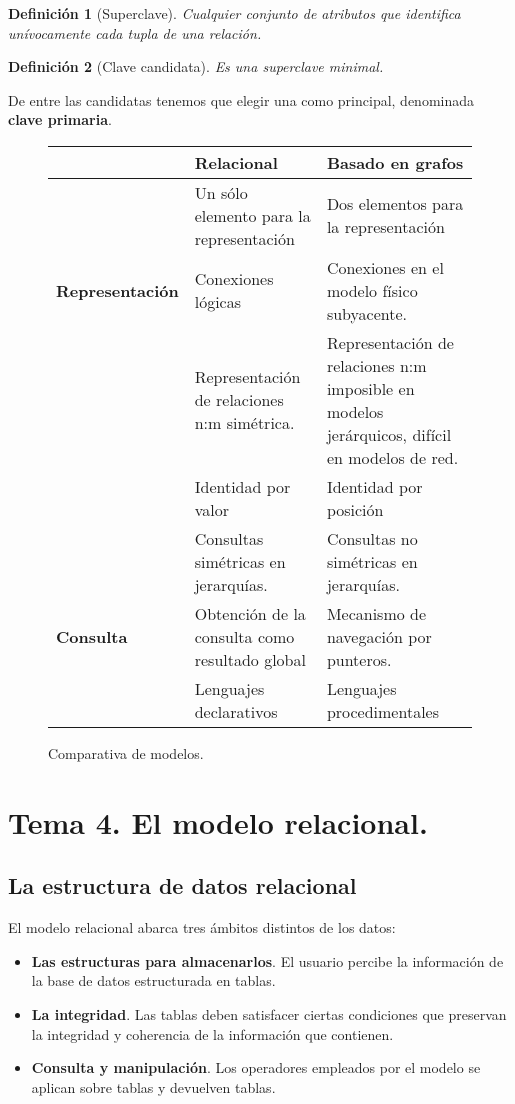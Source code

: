 \documentclass[12pt,spanish]{article}
\newtheorem{definition}{Definición}
\numberwithin{definition}{subsection}
\begin{document}
\begin{definition}[Superclave]
	Cualquier conjunto de atributos que identifica unívocamente cada \emph{tupla} de una relación.
\end{definition}

\begin{definition}[Clave candidata]
	Es una superclave minimal.
\end{definition}

De entre las candidatas tenemos que elegir una como principal, denominada \textbf{clave primaria}.

\begin{figure}[H]
\centering
\begin{tabular}{|m{3cm}|m{6cm}|m{6cm}|}
\hline
 & \textbf{Relacional} & \textbf{Basado en grafos} \\
\hline
 & Un sólo elemento para la representación & Dos elementos para la representación \\
\textbf{Representación} & Conexiones lógicas & Conexiones en el modelo físico subyacente.\\
 & Representación de relaciones n:m simétrica. & Representación de relaciones n:m imposible en modelos jerárquicos, difícil en modelos de red. \\
 & Identidad por valor & Identidad por posición \\
 \hline
 & Consultas simétricas en jerarquías. & Consultas no simétricas en jerarquías. \\
\textbf{Consulta} & Obtención de la consulta como resultado global & Mecanismo de navegación por punteros.\\
 & Lenguajes declarativos & Lenguajes procedimentales \\
 \hline
\end{tabular}
\caption{Comparativa de modelos.}
\end{figure}
\newpage
\section{Tema 4. El modelo relacional.}


\subsection{La estructura de datos relacional}

El modelo relacional abarca tres ámbitos distintos de los datos:

\begin{itemize}
	\item \textbf{Las estructuras para almacenarlos}. El usuario percibe la información de la base de datos estructurada en tablas.
	\item \textbf{La integridad}. Las tablas deben satisfacer ciertas condiciones que preservan la integridad y coherencia de la información que contienen.
	\item \textbf{Consulta y manipulación}. Los operadores empleados por el modelo se aplican sobre tablas y devuelven tablas.
\end{itemize}
\end{document}
